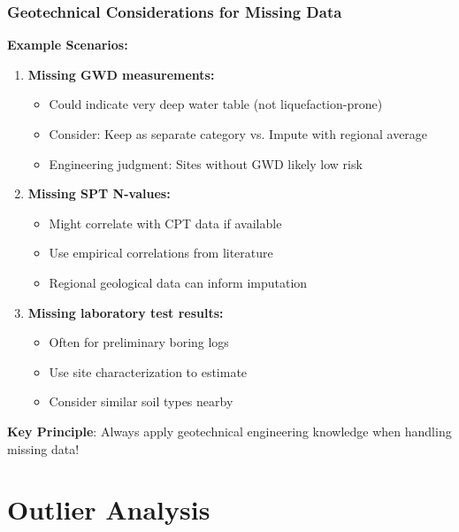 \documentclass[aspectratio=169]{beamer}
\begin{document}
\begin{frame}
\frametitle{Geotechnical Considerations for Missing Data}

\textbf{Example Scenarios:}

\begin{enumerate}
    \item \textbf{Missing GWD measurements:}
    \begin{itemize}
        \item Could indicate very deep water table (not liquefaction-prone)
        \item Consider: Keep as separate category vs. Impute with regional average
        \item Engineering judgment: Sites without GWD likely low risk
    \end{itemize}

    \item \textbf{Missing SPT N-values:}
    \begin{itemize}
        \item Might correlate with CPT data if available
        \item Use empirical correlations from literature
        \item Regional geological data can inform imputation
    \end{itemize}

    \item \textbf{Missing laboratory test results:}
    \begin{itemize}
        \item Often for preliminary boring logs
        \item Use site characterization to estimate
        \item Consider similar soil types nearby
    \end{itemize}
\end{enumerate}

\textbf{Key Principle}: Always apply geotechnical engineering knowledge when handling missing data!

\end{frame}

\section{Outlier Analysis}
\end{document}
